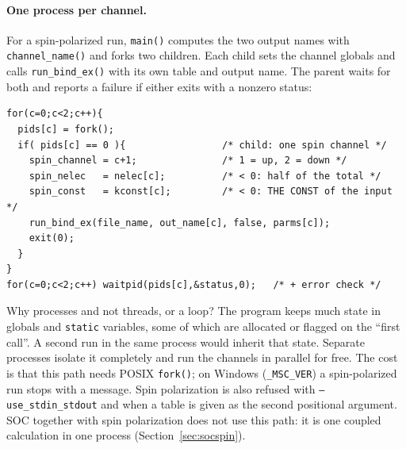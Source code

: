 \documentclass[11pt,a4paper]{article}
\newcommand{\file}[1]{\texttt{#1}}
\newcommand{\fn}[1]{\texttt{#1()}}
\begin{document}
\paragraph{One process per channel.} For a spin-polarized run, \fn{main} computes the two
output names with \fn{channel\_name} and forks two children. Each child sets the
channel globals and calls \fn{run\_bind\_ex} with its own table and output name. The
parent waits for both and reports a failure if either exits with a nonzero status:

\begin{lstlisting}[caption={\file{main.c} (simplified)}]
for(c=0;c<2;c++){
  pids[c] = fork();
  if( pids[c] == 0 ){                 /* child: one spin channel */
    spin_channel = c+1;               /* 1 = up, 2 = down */
    spin_nelec   = nelec[c];          /* < 0: half of the total */
    spin_const   = kconst[c];         /* < 0: THE CONST of the input */
    run_bind_ex(file_name, out_name[c], false, parms[c]);
    exit(0);
  }
}
for(c=0;c<2;c++) waitpid(pids[c],&status,0);   /* + error check */
\end{lstlisting}

Why processes and not threads, or a loop? The program keeps much state in globals and
\texttt{static} variables, some of which are allocated or flagged on the ``first call''.
A second run in the same process would inherit that state. Separate processes isolate it
completely and run the channels in parallel for free. The cost is that this path needs
POSIX \fn{fork}; on Windows (\texttt{\_MSC\_VER}) a spin-polarized run stops with a
message. Spin polarization is also refused with \texttt{--use\_stdin\_stdout} and when a
table is given as the second positional argument. SOC together with spin polarization
does not use this path: it is one coupled calculation in one process
(Section~\ref{sec:socspin}).
\end{document}
